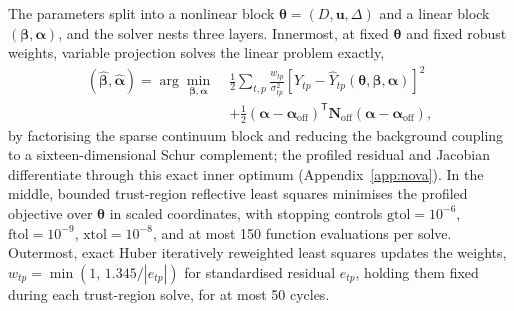 
The parameters split into a nonlinear block
$\bm{\theta}=(D,\bm{u},\Delta)$ and a linear block
$(\bm{\beta},\bm{\alpha})$, and the solver nests three layers. Innermost,
at fixed $\bm{\theta}$ and fixed robust weights, variable projection
\citep{GolubPereyra1973} solves the linear problem exactly,
\begin{equation}
\begin{split}
 (\widehat{\bm{\beta}},\widehat{\bm{\alpha}})=
 \arg\min_{\bm{\beta},\bm{\alpha}}\;
 &\frac{1}{2}\sum_{t,p}\frac{w_{tp}}{\sigma_{tp}^2}
 \left[Y_{tp}-\widehat Y_{tp}(\bm{\theta},\bm{\beta},\bm{\alpha})\right]^2 \\
 &+\frac{1}{2}(\bm{\alpha}-\bm{\alpha}_{\mathrm{off}})^{\mathsf T}
   \bm{N}_{\mathrm{off}}(\bm{\alpha}-\bm{\alpha}_{\mathrm{off}}),
\end{split}
 \label{eq:varpro}
\end{equation}
by factorising the sparse continuum block and reducing the background
coupling to a sixteen-dimensional Schur complement; the profiled residual
and Jacobian differentiate through this exact inner optimum
(Appendix~\ref{app:nova}). In the middle, bounded trust-region reflective
least squares \citep{BranchColemanLi1999} minimises the profiled
objective over $\bm{\theta}$ in scaled coordinates, with stopping
controls $\mathrm{gtol}=10^{-6}$, $\mathrm{ftol}=10^{-9}$,
$\mathrm{xtol}=10^{-8}$, and at most 150 function evaluations per solve.
Outermost, exact Huber iteratively reweighted least squares
\citep{Huber1964} updates the weights,
$w_{tp}=\min(1,\,1.345/|e_{tp}|)$ for standardised residual $e_{tp}$,
holding them fixed during each trust-region solve, for at most 50 cycles.

